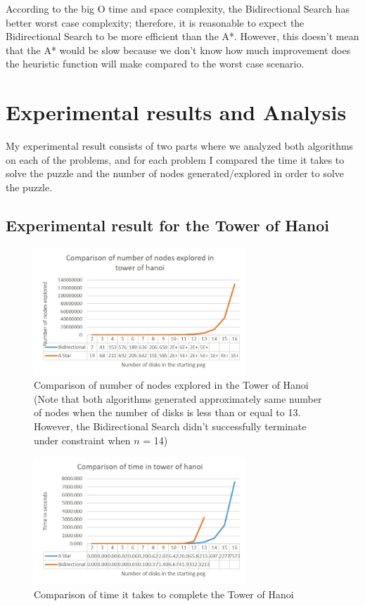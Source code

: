 \documentclass[conference]{IEEEtran}
\begin{document}
According to the big O time and space complexity, the Bidirectional Search has better worst case complexity; therefore, it is reasonable to expect the Bidirectional Search to be more efficient than the A*. However, this doesn't mean that the A* would be slow because we don't know how much improvement does the heuristic function will make compared to the worst case scenario. 

\section{Experimental results and Analysis}

My experimental result consists of two parts where we analyzed both algorithms on each of the problems, and for each problem I compared the time it takes to solve the puzzle and the number of nodes generated/explored in order to solve the puzzle.

\subsection{Experimental result for the Tower of Hanoi}

\begin{figure}[!t]
\includegraphics[width=8cm]{hanoiNodes}
\centering
\caption{Comparison of number of nodes explored in the Tower of Hanoi (Note that both algorithms generated approximately same number of nodes when the number of disks is less than or equal to 13. However, the Bidirectional Search didn't successfully terminate under constraint when $n$ = 14)}
\label{fig_sim}
\end{figure}

\begin{figure}[!t]
\includegraphics[width=8cm]{hanoiTime}
\centering
\caption{Comparison of time it takes to complete the Tower of Hanoi}
\label{fig_sim}
\end{figure}
\end{document}
